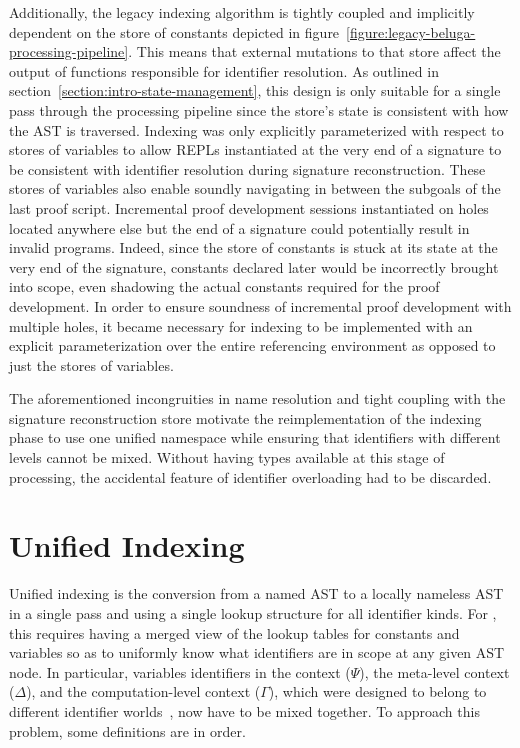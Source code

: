 Additionally, the legacy indexing algorithm is tightly coupled and implicitly dependent on the store of constants depicted in figure~\ref{figure:legacy-beluga-processing-pipeline}.
This means that external mutations to that store affect the output of functions responsible for identifier resolution.
As outlined in section~\ref{section:intro-state-management}, this design is only suitable for a single pass through the processing pipeline since the store's state is consistent with how the \ac{AST} is traversed.
Indexing was only explicitly parameterized with respect to stores of variables to allow \acp{REPL} instantiated at the very end of a \Beluga signature to be consistent with identifier resolution during signature reconstruction.
These stores of variables also enable soundly navigating in \Harpoon between the subgoals of the last proof script.
Incremental proof development sessions instantiated on holes located anywhere else but the end of a \Beluga signature could potentially result in invalid programs.
Indeed, since the store of constants is stuck at its state at the very end of the \Beluga signature, constants declared later would be incorrectly brought into scope, even shadowing the actual constants required for the proof development.
In order to ensure soundness of incremental proof development with multiple holes, it became necessary for indexing to be implemented with an explicit parameterization over the entire referencing environment as opposed to just the stores of variables.

The aforementioned incongruities in name resolution and tight coupling with the signature reconstruction store motivate the reimplementation of the indexing phase to use one unified namespace while ensuring that identifiers with different levels cannot be mixed.
Without having types available at this stage of processing, the accidental feature of identifier overloading had to be discarded.

\section{Unified Indexing}\label{section:indexing}


Unified indexing is the conversion from a named \ac{AST} to a locally nameless \ac{AST} in a single pass and using a single lookup structure for all identifier kinds.
For \Beluga, this requires having a merged view of the lookup tables for constants and variables so as to uniformly know what identifiers are in scope at any given \ac{AST} node.
In particular, variables identifiers in the \LF context ($\Psi$), the meta-level context ($\Delta$), and the computation-level context ($\Gamma$), which were designed to belong to different identifier worlds~\cite{ferreira2012compiler}, now have to be mixed together.
To approach this problem, some definitions are in order.

